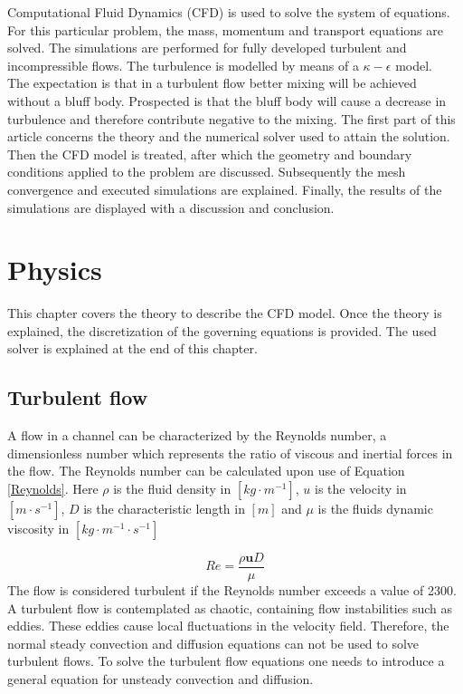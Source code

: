 \documentclass{CFD2017}
\begin{document}
Computational Fluid Dynamics (CFD) is used to solve the system of equations. For this particular problem, the mass, momentum and transport equations are solved. The simulations are performed for fully developed turbulent and incompressible flows. The turbulence is modelled by means of a $\kappa-\epsilon$ model.\\
\newline
The expectation is that in a turbulent flow better mixing will be achieved without a bluff body. Prospected is that the bluff body will cause a decrease in turbulence and therefore contribute negative to the mixing. 
\newline
The first part of this article concerns the theory and the numerical solver used to attain the solution. Then the CFD model is treated, after which the geometry and boundary conditions applied to the problem are discussed. Subsequently the mesh convergence and executed simulations are explained. Finally, the results of the simulations are displayed with a discussion and conclusion.
\newpage


\section{Physics}
This chapter covers the theory to describe the CFD model. Once the theory is explained, the discretization of the governing equations is provided. The used solver is explained at the end of this chapter.

\subsection{Turbulent flow}
A flow in a channel can be characterized by the Reynolds number, a dimensionless number which represents the ratio of viscous and inertial forces in the flow. The Reynolds number can be calculated upon use of Equation \ref{Reynolds}\cite{Versteeg2007}. Here $\rho$ is the fluid density in $[kg\cdot m^{-1}]$, $u$ is the velocity in $[m\cdot s^{-1}]$, $D$ is the characteristic length in $[m]$ and $\mu$ is the fluids dynamic viscosity in $[kg\cdot m^{-1}\cdot s^{-1}]$

\begin{equation}
\label{Reynolds}
Re = \frac{\rho \boldsymbol{u} D}{\mu}
\end{equation}
The flow is considered turbulent if the Reynolds number exceeds a value of 2300. A turbulent flow is contemplated as chaotic, containing flow instabilities such as eddies. These eddies cause local fluctuations in the velocity field. Therefore, the normal steady convection and diffusion equations can not be used to solve turbulent flows. To solve the turbulent flow equations one needs to introduce a general equation for unsteady convection and diffusion\cite{Versteeg2007}.\vspace{2mm}
\end{document}
